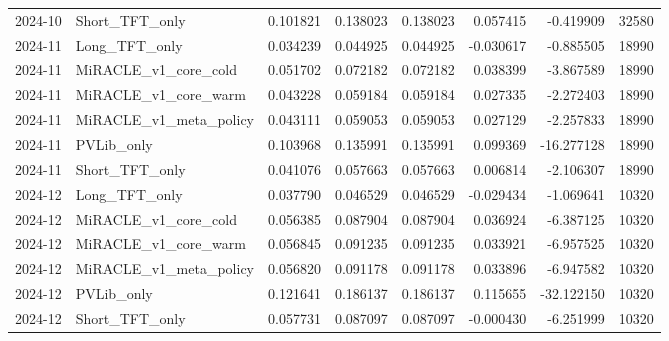 \begin{tabular}{llrrrrrr}
2024-10 & Short_TFT_only & 0.101821 & 0.138023 & 0.138023 & 0.057415 & -0.419909 & 32580 \\
2024-11 & Long_TFT_only & 0.034239 & 0.044925 & 0.044925 & -0.030617 & -0.885505 & 18990 \\
2024-11 & MiRACLE_v1_core_cold & 0.051702 & 0.072182 & 0.072182 & 0.038399 & -3.867589 & 18990 \\
2024-11 & MiRACLE_v1_core_warm & 0.043228 & 0.059184 & 0.059184 & 0.027335 & -2.272403 & 18990 \\
2024-11 & MiRACLE_v1_meta_policy & 0.043111 & 0.059053 & 0.059053 & 0.027129 & -2.257833 & 18990 \\
2024-11 & PVLib_only & 0.103968 & 0.135991 & 0.135991 & 0.099369 & -16.277128 & 18990 \\
2024-11 & Short_TFT_only & 0.041076 & 0.057663 & 0.057663 & 0.006814 & -2.106307 & 18990 \\
2024-12 & Long_TFT_only & 0.037790 & 0.046529 & 0.046529 & -0.029434 & -1.069641 & 10320 \\
2024-12 & MiRACLE_v1_core_cold & 0.056385 & 0.087904 & 0.087904 & 0.036924 & -6.387125 & 10320 \\
2024-12 & MiRACLE_v1_core_warm & 0.056845 & 0.091235 & 0.091235 & 0.033921 & -6.957525 & 10320 \\
2024-12 & MiRACLE_v1_meta_policy & 0.056820 & 0.091178 & 0.091178 & 0.033896 & -6.947582 & 10320 \\
2024-12 & PVLib_only & 0.121641 & 0.186137 & 0.186137 & 0.115655 & -32.122150 & 10320 \\
2024-12 & Short_TFT_only & 0.057731 & 0.087097 & 0.087097 & -0.000430 & -6.251999 & 10320 \\
\bottomrule
\end{tabular}
